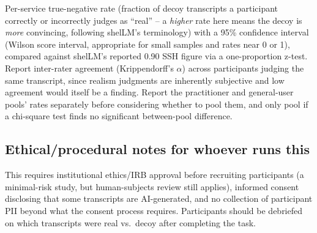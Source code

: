 \documentclass[conference]{IEEEtran}
\begin{document}
Per-service true-negative rate (fraction of decoy transcripts a
participant correctly or incorrectly judges as ``real'' -- a
\emph{higher} rate here means the decoy is \emph{more} convincing,
following shelLM's terminology) with a 95\% confidence interval (Wilson
score interval, appropriate for small samples and rates near 0 or 1),
compared against shelLM's reported 0.90 SSH figure via a one-proportion
z-test. Report inter-rater agreement (Krippendorff's $\alpha$) across
participants judging the same transcript, since realism judgments are
inherently subjective and low agreement would itself be a finding.
Report the practitioner and general-user pools' rates separately before
considering whether to pool them, and only pool if a chi-square test
finds no significant between-pool difference.

\subsection*{Ethical/procedural notes for whoever runs this}

This requires institutional ethics/IRB approval before recruiting
participants (a minimal-risk study, but human-subjects review still
applies), informed consent disclosing that some transcripts are
AI-generated, and no collection of participant PII beyond what the
consent process requires. Participants should be debriefed on which
transcripts were real vs.\ decoy after completing the task.
\end{document}
